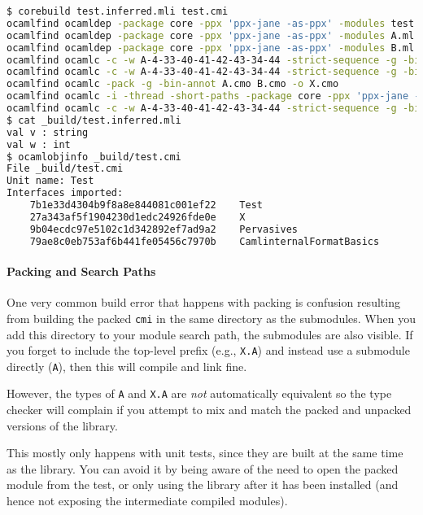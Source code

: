 \begin{lstlisting}[language=bash]
$ corebuild test.inferred.mli test.cmi
ocamlfind ocamldep -package core -ppx 'ppx-jane -as-ppx' -modules test.ml > test.ml.depends
ocamlfind ocamldep -package core -ppx 'ppx-jane -as-ppx' -modules A.ml > A.ml.depends
ocamlfind ocamldep -package core -ppx 'ppx-jane -as-ppx' -modules B.ml > B.ml.depends
ocamlfind ocamlc -c -w A-4-33-40-41-42-43-34-44 -strict-sequence -g -bin-annot -short-paths -thread -package core -ppx 'ppx-jane -as-ppx' -o A.cmo A.ml
ocamlfind ocamlc -c -w A-4-33-40-41-42-43-34-44 -strict-sequence -g -bin-annot -short-paths -thread -package core -ppx 'ppx-jane -as-ppx' -o B.cmo B.ml
ocamlfind ocamlc -pack -g -bin-annot A.cmo B.cmo -o X.cmo
ocamlfind ocamlc -i -thread -short-paths -package core -ppx 'ppx-jane -as-ppx' test.ml > test.inferred.mli
ocamlfind ocamlc -c -w A-4-33-40-41-42-43-34-44 -strict-sequence -g -bin-annot -short-paths -thread -package core -ppx 'ppx-jane -as-ppx' -o test.cmo test.ml
$ cat _build/test.inferred.mli
val v : string
val w : int
$ ocamlobjinfo _build/test.cmi
File _build/test.cmi
Unit name: Test
Interfaces imported:
    7b1e33d4304b9f8a8e844081c001ef22    Test
    27a343af5f1904230d1edc24926fde0e    X
    9b04ecdc97e5102c1d342892ef7ad9a2    Pervasives
    79ae8c0eb753af6b441fe05456c7970b    CamlinternalFormatBasics
\end{lstlisting}

\hypertarget{packing-and-search-paths}{%
\paragraph{Packing and Search Paths}\label{packing-and-search-paths}}

One very common build error that happens with packing is confusion
resulting from building the packed \passthrough{\lstinline!cmi!} in the
same directory as the submodules. When you add this directory to your
module search path, the submodules are also visible. If you forget to
include the top-level prefix (e.g., \passthrough{\lstinline!X.A!}) and
instead use a submodule directly (\passthrough{\lstinline!A!}), then
this will compile and link fine.

However, the types of \passthrough{\lstinline!A!} and
\passthrough{\lstinline!X.A!} are \emph{not} automatically equivalent so
the type checker will complain if you attempt to mix and match the
packed and unpacked versions of the library.

This mostly only happens with unit tests, since they are built at the
same time as the library. You can avoid it by being aware of the need to
open the packed module from the test, or only using the library after it
has been installed (and hence not exposing the intermediate compiled
modules).

